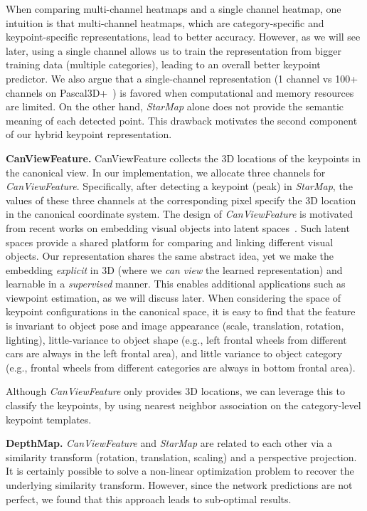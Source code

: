 \documentclass[runningheads]{llncs}
\begin{document}
When comparing multi-channel heatmaps and a single channel heatmap, one intuition is that multi-channel heatmaps, which are category-specific and keypoint-specific representations, lead to better accuracy.
However, as we will see later, using a single channel allows us to train the representation from bigger training data (multiple categories), leading to an overall better keypoint predictor. 
We also argue that a single-channel representation (1 channel vs 100+ channels on Pascal3D+~\cite{xiang2014beyond}) is favored when computational and memory resources are limited.
On the other hand, \emph{StarMap} alone does not provide the semantic meaning of each detected point. 
This drawback motivates the second component of our hybrid keypoint representation.


\noindent\textbf{CanViewFeature.} CanViewFeature collects the 3D locations of the keypoints in the canonical view. 
In our implementation, we allocate three channels for \emph{CanViewFeature}. Specifically, after detecting a keypoint (peak) in \emph{StarMap}, the values of these three channels at the corresponding pixel specify the 3D location in the canonical coordinate system.
The design of \emph{CanViewFeature} is motivated from recent works on embedding visual objects into latent spaces~\cite{taylor2012vitruvian,DBLP:conf/cvpr/WeiHCVL16}.
Such latent spaces provide a shared platform for comparing and linking different visual objects.
Our representation shares the same abstract idea, yet we make the embedding \emph{explicit} in 3D  (where we \emph{can view} the learned representation) and
learnable in a \emph{supervised} manner.
This enables additional applications such as viewpoint estimation, as we will discuss later. 
When considering the space of keypoint configurations in the canonical space, 
it is easy to find that the feature is invariant to object pose and image appearance (scale, translation, rotation, lighting), little-variance 
to object shape (e.g., left frontal wheels from different cars are always in the left frontal area), and little variance to object category (e.g., frontal wheels from different categories are always in bottom frontal area).

Although \emph{CanViewFeature} only provides 3D locations, we can leverage this to classify the keypoints,
by using nearest neighbor association on the category-level keypoint templates. 

\noindent\textbf{DepthMap.} \emph{CanViewFeature} and \emph{StarMap} are related to each other via a similarity transform (rotation, translation, scaling) and a perspective projection. 
It is certainly possible to solve a non-linear optimization problem to recover the underlying similarity transform. 
However, since the network predictions are not perfect, we found that this approach leads to sub-optimal results. 
\end{document}
